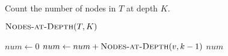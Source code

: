
\begin{algorithm}[H]
  \caption{Count the number of nodes in $T$ at depth $K$.}
  \label{alg:nodes-at-depth-K}
  \begin{algorithmic}[1]
      \State \Return $\Call{Nodes-at-Depth}{T, K}$ 
    \EndProcedure

    \Statex
     
        \State {}
      \EndIf

      \Statex
	\State {}
      \EndIf

      \Statex
      \State $num \gets 0$
	\State $num \gets num + \Call{Nodes-at-Depth}{v, k - 1}$
      \EndFor
      \State \Return $num$
    \EndProcedure
  \end{algorithmic}
\end{algorithm}

